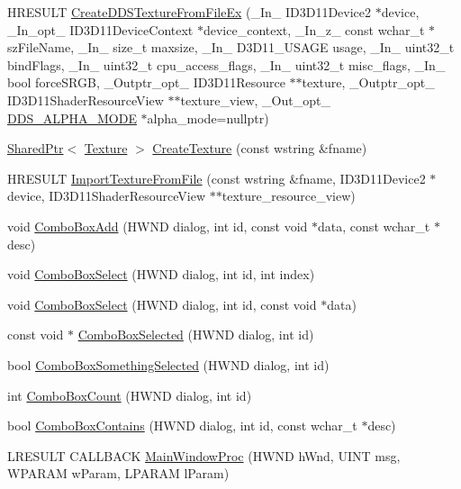 \begin{DoxyCompactItemize}
\item 
H\+R\+E\+S\+U\+LT \hyperlink{namespacemage_ac95c9d854152c94c77105e07ab3890e0}{Create\+D\+D\+S\+Texture\+From\+File\+Ex} (\+\_\+\+In\+\_\+ I\+D3\+D11\+Device2 $\ast$device, \+\_\+\+In\+\_\+opt\+\_\+ I\+D3\+D11\+Device\+Context $\ast$device\+\_\+context, \+\_\+\+In\+\_\+z\+\_\+ const wchar\+\_\+t $\ast$sz\+File\+Name, \+\_\+\+In\+\_\+ size\+\_\+t maxsize, \+\_\+\+In\+\_\+ D3\+D11\+\_\+\+U\+S\+A\+GE usage, \+\_\+\+In\+\_\+ uint32\+\_\+t bind\+Flags, \+\_\+\+In\+\_\+ uint32\+\_\+t cpu\+\_\+access\+\_\+flags, \+\_\+\+In\+\_\+ uint32\+\_\+t misc\+\_\+flags, \+\_\+\+In\+\_\+ bool force\+S\+R\+GB, \+\_\+\+Outptr\+\_\+opt\+\_\+ I\+D3\+D11\+Resource $\ast$$\ast$texture, \+\_\+\+Outptr\+\_\+opt\+\_\+ I\+D3\+D11\+Shader\+Resource\+View $\ast$$\ast$texture\+\_\+view, \+\_\+\+Out\+\_\+opt\+\_\+ \hyperlink{namespacemage_a0c586a2bad862f4858900ca121ca80c2}{D\+D\+S\+\_\+\+A\+L\+P\+H\+A\+\_\+\+M\+O\+DE} $\ast$alpha\+\_\+mode=nullptr)
\item 
\hyperlink{namespacemage_a1e01ae66713838a7a67d30e44c67703e}{Shared\+Ptr}$<$ \hyperlink{classmage_1_1_texture}{Texture} $>$ \hyperlink{namespacemage_ac27913e621bde0fd01312183aafaaca0}{Create\+Texture} (const wstring \&fname)
\item 
H\+R\+E\+S\+U\+LT \hyperlink{namespacemage_ad3c9a6b3f339b92985d202e5cd0f4388}{Import\+Texture\+From\+File} (const wstring \&fname, I\+D3\+D11\+Device2 $\ast$device, I\+D3\+D11\+Shader\+Resource\+View $\ast$$\ast$texture\+\_\+resource\+\_\+view)
\item 
void \hyperlink{namespacemage_a78e4a1d3c21d6eb8657bfa0a9631d6ee}{Combo\+Box\+Add} (H\+W\+ND dialog, int id, const void $\ast$data, const wchar\+\_\+t $\ast$desc)
\item 
void \hyperlink{namespacemage_aa510d1e5e45102338fce66ae46b2b267}{Combo\+Box\+Select} (H\+W\+ND dialog, int id, int index)
\item 
void \hyperlink{namespacemage_a026dd5ecb1cea93f38193f403e878d23}{Combo\+Box\+Select} (H\+W\+ND dialog, int id, const void $\ast$data)
\item 
const void $\ast$ \hyperlink{namespacemage_affa0d91f266dfbe4ed4a29c26b04dcb8}{Combo\+Box\+Selected} (H\+W\+ND dialog, int id)
\item 
bool \hyperlink{namespacemage_afa2451527062c4213d21bdf01b1922c6}{Combo\+Box\+Something\+Selected} (H\+W\+ND dialog, int id)
\item 
int \hyperlink{namespacemage_a5c586938d7f59a82c8528fab41f17960}{Combo\+Box\+Count} (H\+W\+ND dialog, int id)
\item 
bool \hyperlink{namespacemage_a98228034fca63017765bcdf5966be239}{Combo\+Box\+Contains} (H\+W\+ND dialog, int id, const wchar\+\_\+t $\ast$desc)
\item 
L\+R\+E\+S\+U\+LT C\+A\+L\+L\+B\+A\+CK \hyperlink{namespacemage_a7ab7652c75189226bf8299647e897c99}{Main\+Window\+Proc} (H\+W\+ND h\+Wnd, U\+I\+NT msg, W\+P\+A\+R\+AM w\+Param, L\+P\+A\+R\+AM l\+Param)
\end{DoxyCompactItemize}
